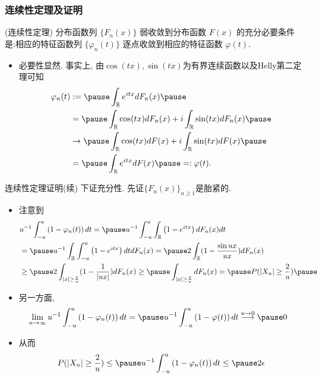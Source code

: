 \begin{frame}
	\frametitle{连续性定理及证明}

	\begin{thm}
		(连续性定理) 分布函数列 $\{F_n (x)\}$ 弱收敛到分布函数 $F (x)$ 的充分必要条件是:相应的特征函数列 $\{\varphi_n (t)\}$ 逐点收敛到相应的特征函数 $\varphi (t)$.
	\end{thm}
\pause

\zheng

\begin{itemize}[<+-|alert@+>]
\item 必要性显然. \pause 事实上, 由$\cos(tx), \sin(tx)$为有界连续函数以及Helly第二定理可知
\begin{align*}
	\varphi_n(t)&:=\pause \int_{\mathbb{R}}e^{itx}dF_n(x)\pause
	\\
	&=\pause \int_{\mathbb{R}}\cos(tx)dF_n(x)+i\int_{\mathbb{R}}\sin(tx)dF_n(x)\pause
	\\
	&\rightarrow\pause \int_{\mathbb{R}}\cos(tx)dF(x)+i\int_{\mathbb{R}}\sin(tx)dF(x)\pause
	\\
	&=\pause \int_{\mathbb{R}}e^{itx}dF(x)\pause
	=:\varphi(t).
\end{align*}
\end{itemize}


\end{frame}
\begin{frame}{连续性定理证明(续)}
下证充分性. 先证$\{F_n(x)\}_{n\geq 1}$是胎紧的.
\begin{itemize}[<+-|alert@+>]
\item 注意到
\begin{align*}
	&u^{-1} \int_{-u}^{u}\left(1-\varphi_{n}(t)\right) d t=\pause u^{-1} \int_{-u}^{u}\int_{\mathbb{R}}\left(1-e^{itx}\right)dF_n(x) d t
	\\ &=\pause u^{-1}\int_{\mathbb{R}}\int_{-u}^{u}\left(1-e^{itx}\right)dt dF_n(x)=\pause 2\int_{\mathbb{R}}(1-\frac{\sin ux}{ux})dF_n(x)\\
	&\geq \pause 2 \int_{|x|\geq\frac{2}{u}}(1-\frac{1}{|ux|})dF_n(x)\geq \pause \int_{|x|\geq\frac{2}{u}}dF_n(x)=\pause P(|X_n|\geq \frac{2}{u})\pause
\end{align*}
\item 另一方面,
\begin{align*}
	&\lim_{n\rightarrow\infty}u^{-1} \int_{-u}^{u}\left(1-\varphi_{n}(t)\right) d t=\pause u^{-1} \int_{-u}^{u}\left(1-\varphi(t)\right) d t \stackrel{u\rightarrow 0}{\longrightarrow} \pause 0
\end{align*}


\item 从而
\[P(|X_n|\geq \frac{2}{u})\leq \pause u^{-1} \int_{-u}^{u}\left(1-\varphi_{n}(t)\right) d t \leq \pause 2 \epsilon
\]
\end{itemize}

\end{frame}

